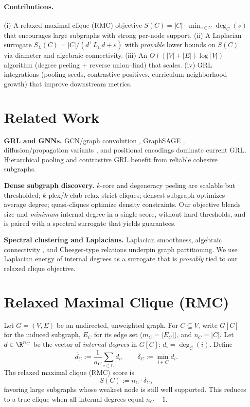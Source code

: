 \documentclass{article} %
\theoremstyle{remark}
\begin{document}
\paragraph{Contributions.}
(i) A relaxed maximal clique (RMC) objective \(S(C)=|C|\cdot \min_{v\in C}\deg_C(v)\) that encourages large subgraphs with strong per-node support. (ii) A Laplacian surrogate \(S_L(C)=|C|/(d^\top L_C d+\varepsilon)\) with \emph{provable} lower bounds on \(S(C)\) via diameter and algebraic connectivity. (iii) An \(O((|V|+|E|)\log|V|)\) algorithm (degree peeling + reverse union--find) that scales. (iv) GRL integrations (pooling seeds, contrastive positives, curriculum neighborhood growth) that improve downstream metrics.

\section{Related Work}
\textbf{GRL and GNNs.}
GCN/graph convolution \citep{kipf2016semi}, GraphSAGE \citep{hamilton2017inductive}, diffusion/propagation variants \citep{klicpera2019diffusion}, and positional encodings \citep{dwivedi2020benchmarking} dominate current GRL. Hierarchical pooling \citep{ying2018hierarchical,gao2019graph} and contrastive GRL \citep{velickovic2019deep, you2020graph} benefit from reliable cohesive subgraphs.

\textbf{Dense subgraph discovery.}
$k$-core \citep{seidman1983network} and degeneracy peeling are scalable but thresholded; $k$-plex/$k$-club \citep{balasundaram2011clique} relax strict cliques; densest subgraph \citep{goldberg1984finding, tsourakakis2013denser} optimizes average degree; quasi-cliques optimize density constraints. Our objective blends size and \emph{minimum} internal degree in a single score, without hard thresholds, and is paired with a spectral surrogate that yields guarantees.

\textbf{Spectral clustering and Laplacians.}
Laplacian smoothness, algebraic connectivity \citep{fiedler1973algebraic}, and Cheeger-type relations \citep{shi2000normalized, chung1997spectral} underpin graph partitioning. We use Laplacian energy of internal degrees as a surrogate that is \emph{provably} tied to our relaxed clique objective.

\section{Relaxed Maximal Clique (RMC)}
Let \(G=(V,E)\) be an undirected, unweighted graph. For \(C\subseteq V\), write \(G[C]\) for the induced subgraph, \(E_C\) for its edge set (\(m_C=|E_C|\)), and \(n_C=|C|\). Let \(d\in\R^{n_C}\) be the vector of \emph{internal degrees} in \(G[C]\): \(d_i=\deg_C(i)\). Define
\[
\bar d_C := \frac{1}{n_C}\sum_{i\in C} d_i,
\qquad
\delta_C := \min_{i\in C} d_i.
\]
The relaxed maximal clique (RMC) score is
\begin{equation}
\label{eq:RMC}
S(C) := n_C \cdot \delta_C,
\end{equation}
favoring large subgraphs whose weakest node is still well supported. This reduces to a true clique when all internal degrees equal \(n_C-1\).
\end{document}

